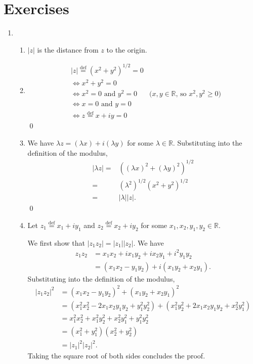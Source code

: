 \documentclass[oneside]{article}
\newcommand\abs[1]{\left|#1\right|}
\newcommand\defeq{\overset{\mathrm{def}}{=}}
\newcommand\bbR{\mathbb{R}}
\begin{document}
  \section{Exercises}
  \begin{enumerate}[label=\textbf{\arabic*.}]
    \item
    \begin{enumerate}[label=\textbf{(\alph*)}]
    \item $\abs{z}$ is the distance from $z$ to the origin.

    \item \begin{align*}
      & \abs{z} \defeq \left(x^2 + y^2\right)^{1/2} = 0 \\
      &\iff
        x^2 + y^2 = 0 \\
      &\iff
        x^2 = 0\text{ and }y^2 = 0 &
        \text{($x, y \in \bbR$, so $x^2, y^2 \geq 0$)} \\
      &\iff
        x = 0\text{ and }y = 0 \\
      &\iff
        z \defeq x + iy = 0
    \end{align*} \qed

    \item We have $\lambda z = (\lambda x) + i (\lambda y)$ for some
      $\lambda \in \bbR$. Substituting into the definition of the modulus,
      \begin{align*}
        \abs{\lambda z} =
        &\left((\lambda x)^2 + (\lambda y)^2\right)^{1/2} \\
        = & \left(\lambda^2\right)^{1/2}\left(x^2 + y^2\right)^{1/2} \\
        = & \abs{\lambda}\abs{z} \text{.}
      \end{align*}
      \qed

    \item Let $z_1 \defeq x_1 + iy_1$ and $z_2 \defeq x_2 + iy_2$ for some
      $x_1, x_2, y_1, y_2 \in \bbR$.

      We first show that $\abs{z_1z_2} = \abs{z_1}\abs{z_2}$. We have
      \begin{align*}
        z_1z_2
        & = x_1x_2 + ix_1y_2 + ix_2y_1 + i^2y_1y_2 \\
        & = (x_1x_2 - y_1y_2) + i(x_1y_2 + x_2y_1)\text{.}
      \end{align*}
      Substituting into the definition of the modulus,
      \begin{align*}
        \abs{z_1z_2}^2 &= (x_1x_2 - y_1y_2)^2+(x_1y_2 + x_2y_1)^2 \\
        &= \left(x_1^2x_2^2 - 2x_1x_2y_1y_2 + y_1^2y_2^2\right)
          + \left(x_1^2y_2^2 + 2x_1x_2y_1y_2 + x_2^2y_1^2\right) \\
        &= x_1^2x_2^2 + x_1^2y_2^2 + x_2^2y_1^2 + y_1^2y_2^2 \\
        &= \left(x_1^2 + y_1^2\right)\left(x_2^2 + y_2^2\right) \\
        &= \abs{z_1}^2\abs{z_2}^2 \text{.}
      \end{align*}
      Taking the square root of both sides concludes the proof.


\end{enumerate}
\end{enumerate}
\end{document}
